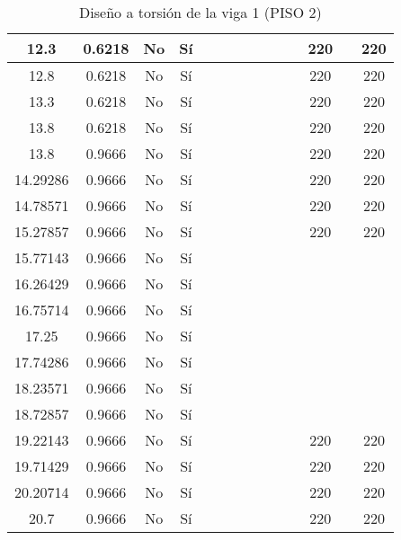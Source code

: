 \begin{table}[H]
{\begin{tabular}{|c|c|c|c|c|c|c|c|c|c|c|c|c|c|}
\hline
12.3 & 0.6218 & No  & Sí  &     &     &     &     &     &     &     & 220 &     & 220 \bigstrut\\
\hline
12.8 & 0.6218 & No  & Sí  &     &     &     &     &     &     &     & 220 &     & 220 \bigstrut\\
\hline
13.3 & 0.6218 & No  & Sí  &     &     &     &     &     &     &     & 220 &     & 220 \bigstrut\\
\hline
13.8 & 0.6218 & No  & Sí  &     &     &     &     &     &     &     & 220 &     & 220 \bigstrut\\
\hline
13.8 & 0.9666 & No  & Sí  &     &     &     &     &     &     &     & 220 &     & 220 \bigstrut\\
\hline
14.29286 & 0.9666 & No  & Sí  &     &     &     &     &     &     &     & 220 &     & 220 \bigstrut\\
\hline
14.78571 & 0.9666 & No  & Sí  &     &     &     &     &     &     &     & 220 &     & 220 \bigstrut\\
\hline
15.27857 & 0.9666 & No  & Sí  &     &     &     &     &     &     &     & 220 &     & 220 \bigstrut\\
\hline
15.77143 & 0.9666 & No  & Sí  &     &     &     &     &     &     &     &     &     &  \bigstrut\\
\hline
16.26429 & 0.9666 & No  & Sí  &     &     &     &     &     &     &     &     &     &  \bigstrut\\
\hline
16.75714 & 0.9666 & No  & Sí  &     &     &     &     &     &     &     &     &     &  \bigstrut\\
\hline
17.25 & 0.9666 & No  & Sí  &     &     &     &     &     &     &     &     &     &  \bigstrut\\
\hline
17.74286 & 0.9666 & No  & Sí  &     &     &     &     &     &     &     &     &     &  \bigstrut\\
\hline
18.23571 & 0.9666 & No  & Sí  &     &     &     &     &     &     &     &     &     &  \bigstrut\\
\hline
18.72857 & 0.9666 & No  & Sí  &     &     &     &     &     &     &     &     &     &  \bigstrut\\
\hline
19.22143 & 0.9666 & No  & Sí  &     &     &     &     &     &     &     & 220 &     & 220 \bigstrut\\
\hline
19.71429 & 0.9666 & No  & Sí  &     &     &     &     &     &     &     & 220 &     & 220 \bigstrut\\
\hline
20.20714 & 0.9666 & No  & Sí  &     &     &     &     &     &     &     & 220 &     & 220 \bigstrut\\
\hline
20.7 & 0.9666 & No  & Sí  &     &     &     &     &     &     &     & 220 &     & 220 \bigstrut\\
\hline
\end{tabular}%

  }
      \caption{Diseño a torsión de la viga 1 (PISO 2) }
  \label{tab:T VG1 P2 }%
\end{table}%
